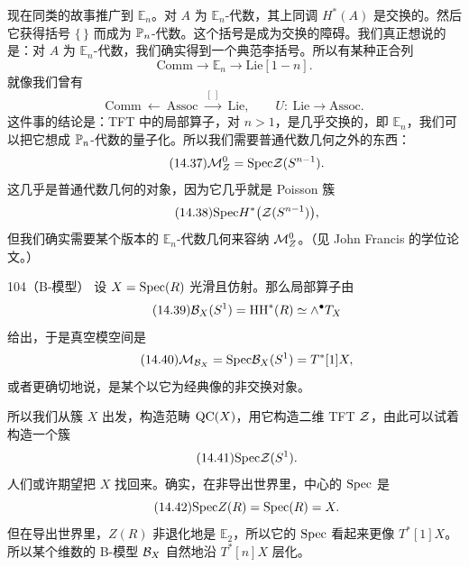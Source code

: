 现在同类的故事推广到 $\mathbb{E}_n$。对 $A$ 为 $\mathbb{E}_n$-代数，其上同调 $H^*(A)$ 是交换的。然后它获得括号 $\{\,\}$ 而成为 $\mathbb{P}_n$-代数。这个括号是成为交换的障碍。我们真正想说的是：对 $A$ 为 $\mathbb{E}_n$-代数，我们确实得到一个典范李括号。所以有某种正合列
\begin{equation}\tag{14.35}
\mathrm{Comm}\to\mathbb{E}_n\to\mathrm{Lie}[1-n].
\end{equation}
就像我们曾有
\begin{equation}\tag{14.36}
\mathrm{Comm}\ \xleftarrow{\ \ }\ \mathrm{Assoc}\ \xrightarrow{\ [\,]\ }\ \mathrm{Lie},
\qquad U:\ \mathrm{Lie}\to\mathrm{Assoc}.
\end{equation}
这件事的结论是：TFT 中的局部算子，对 $n>1$，是几乎交换的，即 $\mathbb{E}_n$，我们可以把它想成 $\mathbb{P}_n$-代数的量子化。所以我们需要普通代数几何之外的东西：
\begin{equation}\tag{14.37}
\mathcal{M}^0_Z=\mathrm{Spec}\mathcal{Z}(S^{n-1}).
\end{equation}
这几乎是普通代数几何的对象，因为它几乎就是 Poisson 簇
\begin{equation}\tag{14.38}
\mathrm{Spec} H^*\bigl(\mathcal{Z}(S^{n-1})\bigr),
\end{equation}
但我们确实需要某个版本的 $\mathbb{E}_n$-代数几何来容纳 $\mathcal{M}^0_Z$。（见 John Francis 的学位论文。）

\begin{srcex}{104（B-模型）}
设 $X=\mathrm{Spec}(R)$ 光滑且仿射。那么局部算子由
\begin{equation}\tag{14.39}
\mathcal{B}_X(S^1)=\mathrm{HH}^*(R)\simeq\wedge^\bullet T_X
\end{equation}
给出，于是真空模空间是
\begin{equation}\tag{14.40}
\mathcal{M}_{\mathcal{B}_X}=\mathrm{Spec}\mathcal{B}_X(S^1)=T^*[1]X,
\end{equation}
或者更确切地说，是某个以它为经典像的非交换对象。
\end{srcex}

所以我们从簇 $X$ 出发，构造范畴 $\mathrm{QC}(X)$，用它构造二维 TFT $\mathcal{Z}$，由此可以试着构造一个簇
\begin{equation}\tag{14.41}
\mathrm{Spec}\mathcal{Z}(S^1).
\end{equation}
人们或许期望把 $X$ 找回来。确实，在非导出世界里，中心的 $\mathrm{Spec}$ 是
\begin{equation}\tag{14.42}
\mathrm{Spec} Z(R)=\mathrm{Spec}(R)=X.
\end{equation}
但在导出世界里，$Z(R)$ 非退化地是 $\mathbb{E}_2$，所以它的 $\mathrm{Spec}$ 看起来更像 $T^*[1]X$。所以某个维数的 B-模型 $\mathcal{B}_X$ 自然地沿 $T^*[n]X$ 层化。

